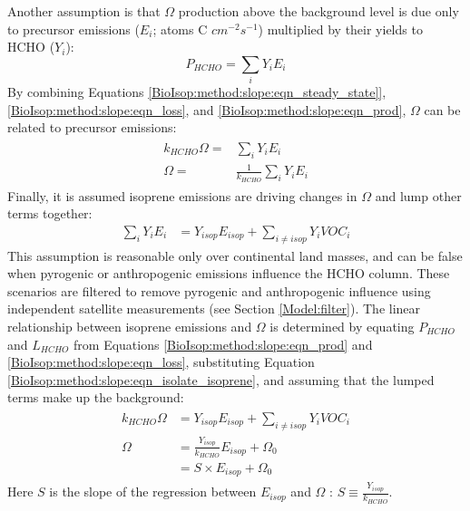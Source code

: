\documentclass[acp, manuscript]{copernicus}
\newcommand{\parencite}{\citep}
\begin{document}
    Another assumption is that $\Omega$ production above the background level is due only to precursor emissions ($E_i$; atoms C $cm^{-2} s^{-1}$) multiplied by their yields to HCHO ($Y_i$):
    \begin{equation}
      \label{BioIsop:method:slope:eqn_prod}
      P_{HCHO}  = \sum_i Y_i E_i 
    \end{equation}
    By combining Equations \ref{BioIsop:method:slope:eqn_steady_state]}, \ref{BioIsop:method:slope:eqn_loss}, and \ref{BioIsop:method:slope:eqn_prod}, $\Omega$ can be related to precursor emissions:
    \begin{eqnarray} \begin{split}
      k_{HCHO} \Omega = & \sum_i Y_i E_i \\
      \Omega = & \frac{1}{k_{HCHO}} \sum_i Y_i E_i
    \end{split} \end{eqnarray}
    Finally, it is assumed isoprene emissions are driving changes in $\Omega$ \parencite[as assumed elsewhere, e.g.,][]{Palmer2003,Millet2008,Marais2014,Stavrakou2015} and lump other terms together:
    \begin{eqnarray}
      \label{BioIsop:method:slope:eqn_isolate_isoprene}
      \sum_i Y_i E_i  & = Y_{isop} E_{isop} + \sum_{i \ne isop} Y_{i} VOC_{i} 
    \end{eqnarray}
    This assumption is reasonable only over continental land masses, and can be false when pyrogenic or anthropogenic emissions influence the HCHO column.
    These scenarios are filtered to remove pyrogenic and anthropogenic influence using independent satellite measurements (see Section \ref{Model:filter}).
    The linear relationship between isoprene emissions and $\Omega$ is determined by equating $P_{HCHO}$ and $L_{HCHO}$ from Equations \ref{BioIsop:method:slope:eqn_prod} and \ref{BioIsop:method:slope:eqn_loss}, substituting Equation \ref{BioIsop:method:slope:eqn_isolate_isoprene}, and assuming that the lumped terms make up the background:
    \begin{eqnarray} 
      \label{BioIsop:method:slope:eqn_isop_to_hcho}
      \begin{split}
        k_{HCHO}\Omega 
        & = Y_{isop} E_{isop} + \sum_{i \ne isop} Y_{i} VOC_{i} \\
        \Omega 
        & = \frac{Y_{isop}}{k_{HCHO}} E_{isop} + \Omega_0 \\
        & = S \times E_{isop} + \Omega_0
      \end{split} 
    \end{eqnarray}
    Here $S$ is the slope of the regression between $E_{isop}$ and $\Omega$ : $S \equiv \frac{Y_{isop}}{k_{HCHO}}$.
    
\end{document}
